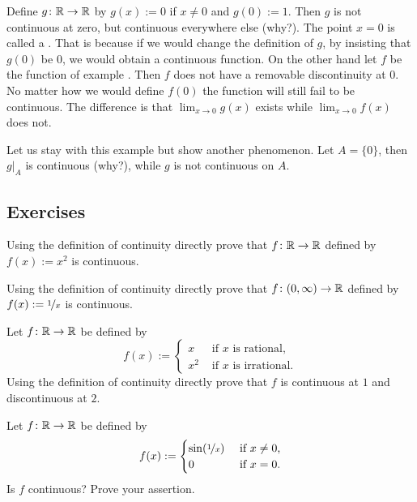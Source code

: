 \begin{example}
Define
$g \colon {\mathbb{R}} \to {\mathbb{R}}$ by $g(x) := 0$ if $x \not= 0$ and
$g(0) := 1$.  Then $g$ is not continuous at zero, but continuous everywhere else (why?).
The point $x=0$ is called a \emph{}.  That
is because if we would change the definition of $g$, by insisting that
$g(0)$ be $0$, we would obtain a continuous function.  On the other hand
let $f$ be the function of example .
Then $f$ does not have a
removable discontinuity at $0$.  No matter how we would define $f(0)$ the function
will still fail to be continuous.  The difference is that 
$\lim_{x\to 0} g(x)$ exists while
$\lim_{x\to 0} f(x)$ does not.

Let us stay with this example but show another phenomenon.  Let $A = \{ 0
\}$, then $g|_A$ is continuous (why?), while $g$ is not continuous on $A$.
\end{example}

\subsection{Exercises}

\begin{exercise}
Using the definition of continuity directly prove that
$f \colon {\mathbb{R}} \to {\mathbb{R}}$ defined by
$f(x) := x^2$ is continuous.
\end{exercise}

\begin{exercise}
Using the definition of continuity directly prove that
$f \colon (0,\infty) \to {\mathbb{R}}$ defined by
$f(x) := \nicefrac{1}{x}$ is continuous.
\end{exercise}

\begin{exercise}
Let $f \colon {\mathbb{R}} \to {\mathbb{R}}$ be defined by
\begin{equation*}
f(x) :=
\begin{cases}
x & \text{ if $x$ is rational,} \\
x^2 & \text{ if $x$ is irrational.}
\end{cases}
\end{equation*}
Using the definition of continuity directly prove that
$f$ is continuous at $1$ and discontinuous at $2$.
\end{exercise}

\begin{exercise}
Let $f \colon {\mathbb{R}} \to {\mathbb{R}}$ be
defined by
\begin{equation*}
f(x) :=
\begin{cases}
\sin(\nicefrac{1}{x}) & \text{ if $x \not= 0$,} \\
0 & \text{ if $x=0$.}
\end{cases}
\end{equation*}
Is $f$ continuous?  Prove your assertion.
\end{exercise}


